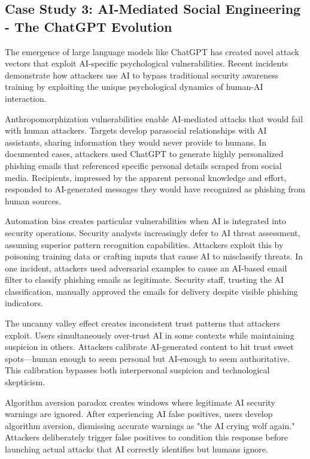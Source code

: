 \documentclass[11pt,a4paper]{article}
\begin{document}
\subsection{Case Study 3: AI-Mediated Social Engineering - The ChatGPT Evolution}

The emergence of large language models like ChatGPT has created novel attack vectors that exploit AI-specific psychological vulnerabilities. Recent incidents demonstrate how attackers use AI to bypass traditional security awareness training by exploiting the unique psychological dynamics of human-AI interaction.

Anthropomorphization vulnerabilities enable AI-mediated attacks that would fail with human attackers. Targets develop parasocial relationships with AI assistants, sharing information they would never provide to humans. In documented cases, attackers used ChatGPT to generate highly personalized phishing emails that referenced specific personal details scraped from social media. Recipients, impressed by the apparent personal knowledge and effort, responded to AI-generated messages they would have recognized as phishing from human sources.

Automation bias creates particular vulnerabilities when AI is integrated into security operations. Security analysts increasingly defer to AI threat assessment, assuming superior pattern recognition capabilities. Attackers exploit this by poisoning training data or crafting inputs that cause AI to misclassify threats. In one incident, attackers used adversarial examples to cause an AI-based email filter to classify phishing emails as legitimate. Security staff, trusting the AI classification, manually approved the emails for delivery despite visible phishing indicators.

The uncanny valley effect creates inconsistent trust patterns that attackers exploit. Users simultaneously over-trust AI in some contexts while maintaining suspicion in others. Attackers calibrate AI-generated content to hit trust sweet spots—human enough to seem personal but AI-enough to seem authoritative. This calibration bypasses both interpersonal suspicion and technological skepticism.

Algorithm aversion paradox creates windows where legitimate AI security warnings are ignored. After experiencing AI false positives, users develop algorithm aversion, dismissing accurate warnings as "the AI crying wolf again." Attackers deliberately trigger false positives to condition this response before launching actual attacks that AI correctly identifies but humans ignore.
\end{document}
